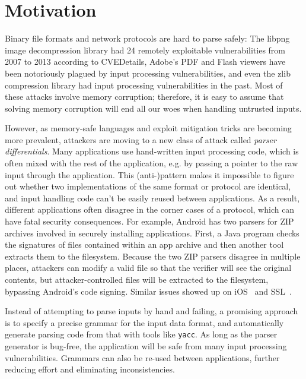 \documentclass[a4paper]{article}
\begin{document}
\newpage

\section{Motivation}
Binary file formats and network protocols are hard to parse safely: 
The libpng image decompression library had 24 remotely
exploitable vulnerabilities from 2007 to 2013 according to CVEDetails,
Adobe's PDF and Flash viewers have been notoriously plagued by input
processing vulnerabilities, and even the zlib compression library had
input processing vulnerabilities in the past.
Most of these attacks involve memory corruption; therefore, it is easy to assume that 
solving memory corruption will end all our woes when handling untrusted inputs. 

However, as memory-safe languages and exploit mitigation  tricks are becoming more prevalent,
attackers are moving to a new class of attack called {\em parser differentials}. Many applications use
hand-written input processing code, which is often mixed with the rest of the application, e.g. by
passing a pointer to the raw input through the application. This (anti-)pattern makes it impossible
to figure out whether two implementations of the same format or protocol are identical, and input
handling code can't be easily reused between applications. As a result, different applications often
disagree in the corner cases of a protocol, which can have fatal security consequences. For example,
Android has two parsers for ZIP archives involved in securely installing applications. First, a Java
program checks the signatures of files contained within an app archive and then another tool
extracts them to the filesystem. Because the two ZIP parsers disagree in multiple places, attackers
can modify a valid file so that the verifier will see the original contents, but attacker-controlled
files will be extracted to the filesystem, bypassing Android's code signing. Similar issues showed
up on iOS~\cite{geohot-evasion} and SSL~\cite{DBLP:conf/fc/KaminskyPS10}.


Instead of attempting to parse inputs by hand and failing, 
a promising approach is to specify
a precise grammar for the input data format, and automatically generate parsing code from that with tools like {\tt yacc}. As long
as the parser generator is bug-free, the application will be safe from many
input processing vulnerabilities. Grammars can also be re-used between
applications, further reducing effort and eliminating inconsistencies.
\end{document}
